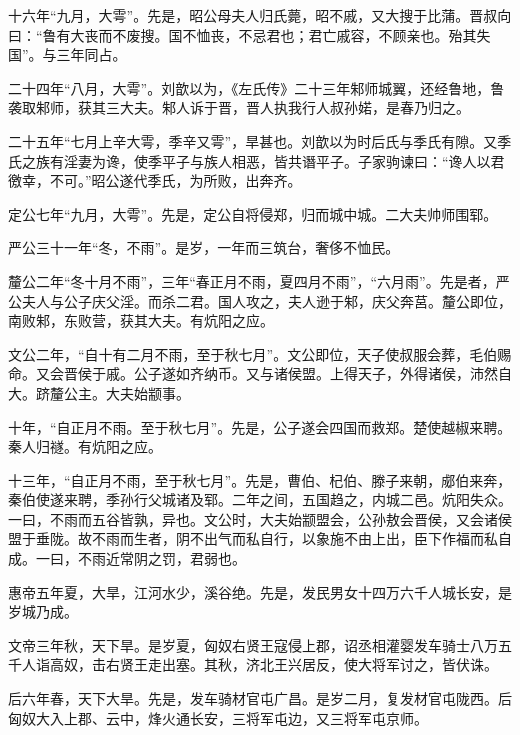\documentclass[12pt,UTF8]{ctexbook}
\begin{document}
十六年“九月，大雩”。先是，昭公母夫人归氏薨，昭不戚，又大搜于比蒲。晋叔向曰：“鲁有大丧而不废搜。国不恤丧，不忌君也；君亡戚容，不顾亲也。殆其失国”。与三年同占。



二十四年“八月，大雩”。刘歆以为，《左氏传》二十三年邾师城翼，还经鲁地，鲁袭取邾师，获其三大夫。邾人诉于晋，晋人执我行人叔孙婼，是春乃归之。



二十五年“七月上辛大雩，季辛又雩”，旱甚也。刘歆以为时后氏与季氏有隙。又季氏之族有淫妻为谗，使季平子与族人相恶，皆共谮平子。子家驹谏曰：“谗人以君徼幸，不可。”昭公遂代季氏，为所败，出奔齐。



定公七年“九月，大雩”。先是，定公自将侵郑，归而城中城。二大夫帅师围郓。



严公三十一年“冬，不雨”。是岁，一年而三筑台，奢侈不恤民。



釐公二年“冬十月不雨”，三年“春正月不雨，夏四月不雨”，“六月雨”。先是者，严公夫人与公子庆父淫。而杀二君。国人攻之，夫人逊于邾，庆父奔莒。釐公即位，南败邾，东败营，获其大夫。有炕阳之应。



文公二年，“自十有二月不雨，至于秋七月”。文公即位，天子使叔服会葬，毛伯赐命。又会晋侯于戚。公子遂如齐纳币。又与诸侯盟。上得天子，外得诸侯，沛然自大。跻釐公主。大夫始颛事。



十年，“自正月不雨。至于秋七月”。先是，公子遂会四国而救郑。楚使越椒来聘。秦人归禭。有炕阳之应。



十三年，“自正月不雨，至于秋七月”。先是，曹伯、杞伯、滕子来朝，郕伯来奔，秦伯使遂来聘，季孙行父城诸及郓。二年之间，五国趋之，内城二邑。炕阳失众。一曰，不雨而五谷皆孰，异也。文公时，大夫始颛盟会，公孙敖会晋侯，又会诸侯盟于垂陇。故不雨而生者，阴不出气而私自行，以象施不由上出，臣下作福而私自成。一曰，不雨近常阴之罚，君弱也。



惠帝五年夏，大旱，江河水少，溪谷绝。先是，发民男女十四万六千人城长安，是岁城乃成。



文帝三年秋，天下旱。是岁夏，匈奴右贤王寇侵上郡，诏丞相灌婴发车骑士八万五千人诣高奴，击右贤王走出塞。其秋，济北王兴居反，使大将军讨之，皆伏诛。



后六年春，天下大旱。先是，发车骑材官屯广昌。是岁二月，复发材官屯陇西。后匈奴大入上郡、云中，烽火通长安，三将军屯边，又三将军屯京师。
\end{document}
